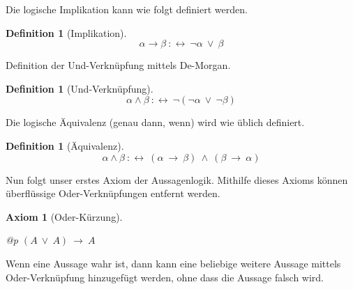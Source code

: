\documentclass[a4paper,german,10pt,twoside]{book}
\newtheorem{ax}{Axiom}
\theoremstyle{definition}
\newtheorem{defn}[thm]{Definition}
\theoremstyle{remark}
\begin{document}
\par
Die logische Implikation kann wie folgt definiert werden.

\begin{defn}[Implikation]
\label{definition:implication} \hypertarget{definition:implication}{}
$$\alpha \rightarrow \beta\ :\leftrightarrow \ \neg \alpha\ \lor \ \beta$$

\end{defn}




\par
Definition der Und-Verkn{\"u}pfung mittels De-Morgan.

\begin{defn}[Und-Verkn{\"u}pfung]
\label{definition:conjunction} \hypertarget{definition:conjunction}{}
$$\alpha \land \beta\ :\leftrightarrow \ \neg (\neg \alpha\ \lor \ \neg \beta)$$

\end{defn}




\par
Die logische {\"A}quivalenz ({\glqq genau dann, wenn\grqq}) wird wie 
{\"u}blich definiert.

\begin{defn}[{\"A}quivalenz]
\label{definition:equivalence} \hypertarget{definition:equivalence}{}
$$\alpha \land \beta\ :\leftrightarrow \ (\alpha\ \rightarrow \ \beta)\ \land \ (\beta\ \rightarrow \ \alpha)$$

\end{defn}




\par
Nun folgt unser erstes Axiom der Aussagenlogik. Mithilfe dieses 
Axioms k{\"o}nnen {\"u}berfl{\"u}ssige Oder-Verkn{\"u}pfungen entfernt werden.

\begin{ax}[Oder-K{\"u}rzung]
\label{axiom:disjunction_idempotence} \hypertarget{axiom:disjunction_idempotence}{}
\mbox{}
\begin{longtable}{{@{\extracolsep{\fill}}p{\linewidth}}}
\centering $(A\ \lor \ A)\ \rightarrow \ A$
\end{longtable}

\end{ax}




\par
Wenn eine Aussage wahr ist, dann kann eine beliebige weitere Aussage mittels Oder-Verkn{\"u}pfung hinzugef{\"u}gt werden, 
ohne dass die Aussage falsch wird.
\end{document}
